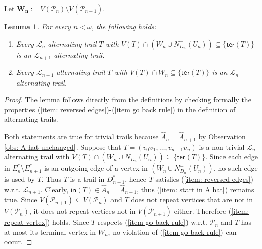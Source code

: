\documentclass[12pt,a4paper]{amsart}
\theoremstyle{plain}
\newtheorem{lemma}[theorem]{Lemma}
\theoremstyle{definition}
\begin{document}
Let $\boldsymbol{W_n}:= V(\mathcal{P}_{n})\setminus 
V(\mathcal{P}_{n+1})  $.
\begin{lemma}\label{lem: remains alternating trail}
For every $ n<\omega $, the following holds:
\begin{enumerate}
\item Every $ \mathcal{L}_{n} $-alternating trail $ T $ with 
$ V(T)\cap (W_n \cup N_{D_{n}}^{-}(U_n))\subseteq \{ \mathsf{ter}(T) \} $ is an $ \mathcal{L}_{n+1} $-alternating 
trail.
\item Every $ \mathcal{L}_{n+1} $-alternating trail $ T $ with $ V(T)\cap W_n \subseteq \{ \mathsf{ter}(T) \} $ is an $ 
\mathcal{L}_n $-alternating trail.
\end{enumerate}
\end{lemma}
\begin{proof}
The lemma follows directly from the definitions by checking formally the properties (\ref{item: reversed edges})-(\ref{item 
go back rule}) in the definition of alternating trails.

 Both statements are true for trivial trails 
because  $ \widehat{A}_n=\widehat{A}_{n+1} $ by Observation \ref{obs: A hat 
unchanged}. Suppose that $ T=(v_0v_1,\dots, v_{n-1}v_n) $  is a non-trivial $ \mathcal{L}_{n} $-alternating trail with 
$ V(T)\cap (W_n \cup N_{D_{n}}^{-}(U_n)) \subseteq \{ \mathsf{ter}(T) \} $.  Since each edge in  $ E_n^{*}\setminus 
E_{n+1}^{*} $ is  an outgoing edge of  a vertex in $ (W_n \cup N_{D_{n}}^{-}(U_n)) $, no such edge is used by $ T 
$. Thus $ 
T $ is a trail in $ D^{*}_{n+1} $, hence $ T $ satisfies (\ref{item: reversed edges})  w.r.t. $ \mathcal{L}_{n+1} $. Clearly,  
$ 
\mathsf{in}(T)\in 
\widehat{A}_{n}=\widehat{A}_{n+1} $, 
thus (\ref{item: start in A hat}) remains true. Since $ V(\mathcal{P}_{n+1})\subseteq V(\mathcal{P}_n) $ and $ T $ does not 
repeat vertices that are not 
in $ V(\mathcal{P}_{n}) $,  it does not repeat vertices not in $ V(\mathcal{P}_{n+1}) $ either. Therefore (\ref{item: repeat 
vertex})  holds. Since $ T $ 
respects (\ref{item go back rule}) w.r.t. $ \mathcal{P}_n $ and $ T $ has 
at most its terminal vertex in 
$ W_n  $, no violation of  (\ref{item go back rule}) can occur.


\end{proof}
\end{document}
